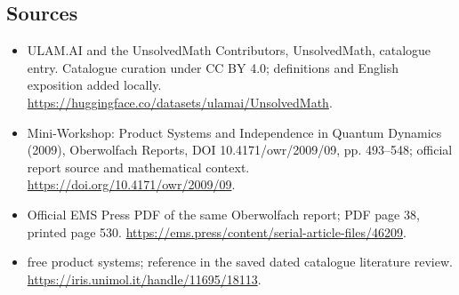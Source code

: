 \documentclass[11pt]{article}
\begin{document}
\subsection{Sources}
\begin{itemize}
\item[\hypertarget{source:statement:1}{S1}] ULAM.AI and the UnsolvedMath Contributors, UnsolvedMath, catalogue entry. Catalogue curation under CC BY 4.0; definitions and English exposition added locally.
\url{https://huggingface.co/datasets/ulamai/UnsolvedMath}.
\item[\hypertarget{source:statement:2}{S2}] Mini-Workshop: Product Systems and Independence in Quantum Dynamics (2009), Oberwolfach Reports, DOI 10.4171/owr/2009/09, pp. 493--548; official report source and mathematical context.
\url{https://doi.org/10.4171/owr/2009/09}.
\item[\hypertarget{source:statement:3}{S3}] Official EMS Press PDF of the same Oberwolfach report; PDF page 38, printed page 530.
\url{https://ems.press/content/serial-article-files/46209}.
\item[\hypertarget{source:statement:4}{S4}] free product systems; reference in the saved dated catalogue literature review.
\url{https://iris.unimol.it/handle/11695/18113}.
\end{itemize}
\label{end:statement}
\end{document}
